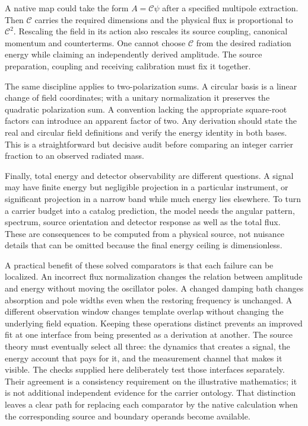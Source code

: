 A native map could take the form $A=\mathcal C\psi$ after a specified multipole extraction. Then $\mathcal C$ carries the required dimensions and the physical flux is proportional to $\mathcal C^2$. Rescaling the field in its action also rescales its source coupling, canonical momentum and counterterms. One cannot choose $\mathcal C$ from the desired radiation energy while claiming an independently derived amplitude. The source preparation, coupling and receiving calibration must fix it together.

The same discipline applies to two-polarization sums. A circular basis is a linear change of field coordinates; with a unitary normalization it preserves the quadratic polarization sum. A convention lacking the appropriate square-root factors can introduce an apparent factor of two. Any derivation should state the real and circular field definitions and verify the energy identity in both bases. This is a straightforward but decisive audit before comparing an integer carrier fraction to an observed radiated mass.

Finally, total energy and detector observability are different questions. A signal may have finite energy but negligible projection in a particular instrument, or significant projection in a narrow band while much energy lies elsewhere. To turn a carrier budget into a catalog prediction, the model needs the angular pattern, spectrum, source orientation and detector response as well as the total flux. These are consequences to be computed from a physical source, not nuisance details that can be omitted because the final energy ceiling is dimensionless.

A practical benefit of these solved comparators is that each failure can be localized. An incorrect flux normalization changes the relation between amplitude and energy without moving the oscillator poles. A changed damping bath changes absorption and pole widths even when the restoring frequency is unchanged. A different observation window changes template overlap without changing the underlying field equation. Keeping these operations distinct prevents an improved fit at one interface from being presented as a derivation at another. The source theory must eventually select all three: the dynamics that creates a signal, the energy account that pays for it, and the measurement channel that makes it visible. The checks supplied here deliberately test those interfaces separately. Their agreement is a consistency requirement on the illustrative mathematics; it is not additional independent evidence for the carrier ontology. That distinction leaves a clear path for replacing each comparator by the native calculation when the corresponding source and boundary operands become available.

